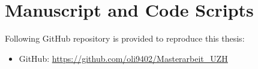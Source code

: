 \section{Manuscript and Code Scripts}
Following GitHub repository is provided to reproduce this thesis:

\begin{itemize}
    \item  GitHub: \url{https://github.com/oli9402/Masterarbeit_UZH}

\end{itemize}